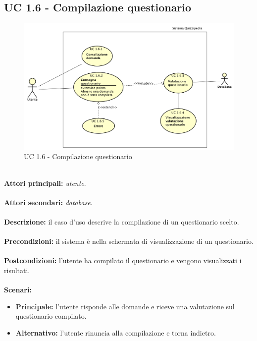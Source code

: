 \documentclass[a4paper,11pt]{article}
\begin{document}
\newpage

\subsection{UC 1.6 - Compilazione questionario}

\begin{figure}[h!]
\centering
\includegraphics[scale=0.4]{../immagini/UC1_6.png}
\caption{UC 1.6 - Compilazione questionario}
\end{figure}
\ \\
\textbf{Attori principali:} \textit{utente}.\\
\ \\
\textbf{Attori secondari:} \textit{database}.\\
\\
\textbf{Descrizione:} il caso d'uso descrive la compilazione di un questionario scelto. \\
\\
\textbf{Precondizioni:} il sistema è nella schermata di visualizzazione di un questionario.\\
\\
\textbf{Postcondizioni:} l'utente ha compilato il questionario e vengono visualizzati i risultati. \\
\\
\textbf{Scenari:}
\begin{itemize}
\item \textbf{Principale:} l'utente risponde alle domande e riceve una valutazione sul questionario compilato.
\item \textbf{Alternativo:} l'utente rinuncia alla compilazione e torna indietro.\\ 
\end{itemize}
\vspace{6 mm}
\end{document}

